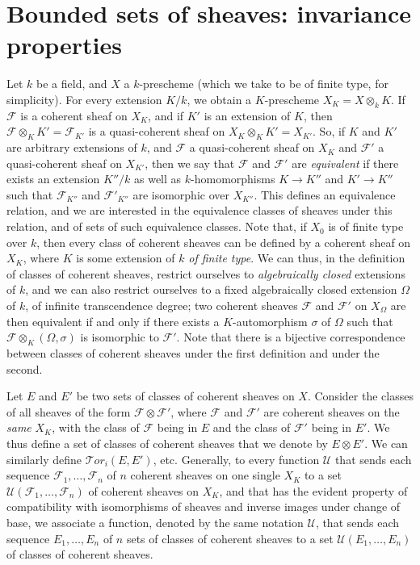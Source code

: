 \section{Bounded sets of sheaves: invariance properties}\label{fga3.iv-1}

Let $k$ be a field, and $X$ a $k$-prescheme (which we take to be of finite type, for simplicity).
For every extension $K/k$, we obtain a $K$-prescheme $X_K=X\otimes_k K$.
If $\mathcal{F}$ is a coherent sheaf on $X_K$, and if $K'$ is an extension of $K$, then $\mathcal{F}\otimes_K K'=\mathcal{F}_{K'}$ is a quasi-coherent sheaf on $X_K\otimes_KK'=X_{K'}$.
So, if $K$ and $K'$ are arbitrary extensions of $k$, and $\mathcal{F}$ a quasi-coherent sheaf on $X_K$ and $\mathcal{F}'$ a quasi-coherent sheaf on $X_{K'}$, then we say that $\mathcal{F}$ and $\mathcal{F}'$ are \emph{equivalent} if there exists an extension $K''/k$ as well as $k$-homomorphisms $K\to K''$ and $K'\to K''$ such that $\mathcal{F}_{K''}$ and $\mathcal{F}'_{K''}$ are isomorphic over $X_{K''}$.
This defines an equivalence relation, and we are interested in the equivalence classes of sheaves under this relation, and of sets of such equivalence classes.
Note that, if $X_0$ is of finite type over $k$, then every class of coherent sheaves can be defined by a coherent sheaf on $X_K$, where $K$ is some extension of $k$ \emph{of finite type}.
We can thus, in the definition of classes of coherent sheaves, restrict ourselves to \emph{algebraically closed} extensions of $k$, and we can also restrict ourselves to a fixed algebraically closed extension $\Omega$ of $k$, of infinite transcendence degree;
two coherent sheaves $\mathcal{F}$ and $\mathcal{F}'$ on $X_\Omega$ are then equivalent if and only if there exists a $K$-automorphism $\sigma$ of $\Omega$ such that $\mathcal{F}\otimes_K(\Omega,\sigma)$ is isomorphic to $\mathcal{F}'$.
Note that there is a bijective correspondence between classes of coherent sheaves under the first definition and under the second.

Let $E$ and $E'$ be two sets of classes of coherent sheaves on $X$.
Consider the classes of all sheaves of the form $\mathcal{F}\otimes\mathcal{F}'$, where $\mathcal{F}$ and $\mathcal{F}'$ are coherent sheaves on the \emph{same} $X_K$, with the class of $\mathcal{F}$ being in $E$ and the class of $\mathcal{F}'$ being in $E'$.
We thus define a set of classes of coherent sheaves that we denote by $E\otimes E'$.
We can similarly define $\mathcal{T}or_i(E,E')$, etc.
Generally, to every function $\mathcal{U}$ that sends each sequence $\mathcal{F}_1,\ldots,\mathcal{F}_n$ of $n$ coherent sheaves on one single $X_K$ to a set $\mathcal{U}(\mathcal{F}_1,\ldots,\mathcal{F}_n)$ of coherent sheaves on $X_K$, and that has the evident property of compatibility with isomorphisms of sheaves and inverse images under change of base, we associate a function, denoted by the same notation $\mathcal{U}$, that sends each sequence $E_1,\ldots,E_n$ of $n$ sets of classes of coherent sheaves to a set $\mathcal{U}(E_1,\ldots,E_n)$ of classes of coherent sheaves.


